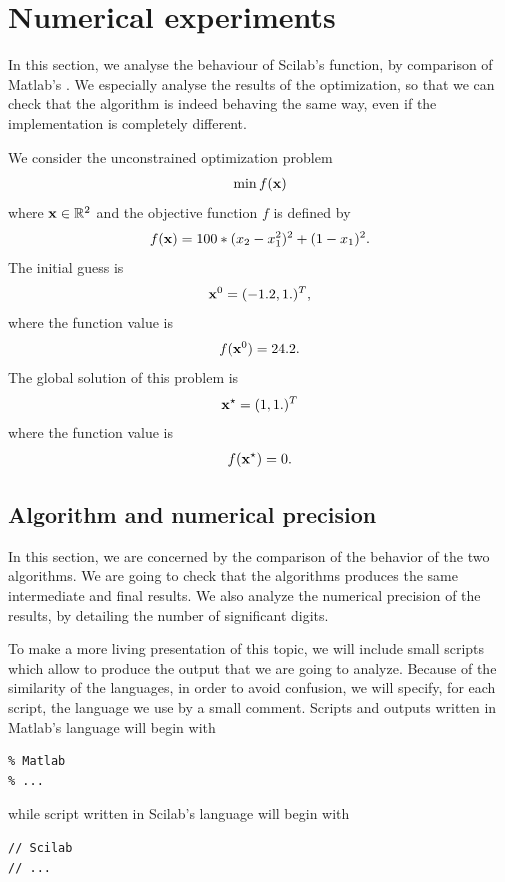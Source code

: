 \section{Numerical experiments}

In this section, we analyse the behaviour of Scilab's 
function, by comparison of Matlab's . We especially analyse 
the results of the optimization, so that we can check that the algorithm
is indeed behaving the same way, even if the implementation is completely 
different. 

We consider the unconstrained optimization problem \cite{citeulike:1903787}
\begin{eqnarray}
\min f(\mathbf{x})
\end{eqnarray}
where $\mathbf{x}\in\mathbb{R}^2$ and the objective function $f$ is defined by 
\begin{eqnarray}
f(\mathbf{x}) = 100*(x_2-x_1^2)^2+(1-x_1)^2.
\end{eqnarray}
The initial guess is 
\begin{eqnarray}
\mathbf{x}^0 = ( -1.2 , 1.)^T,
\end{eqnarray}
where the function value is 
\begin{eqnarray}
f(\mathbf{x}^0) = 24.2.
\end{eqnarray}
The global solution of this problem is
\begin{eqnarray}
\mathbf{x}^\star = ( 1 , 1.)^T
\end{eqnarray}
where the function value is 
\begin{eqnarray}
f(\mathbf{x}^\star) = 0.
\end{eqnarray}

\subsection{Algorithm and numerical precision}

In this section, we are concerned by the comparison of the behavior 
of the two algorithms. We are going to check that the algorithms 
produces the same intermediate and final results.
We also analyze the numerical precision of the results,
by detailing the number of significant digits.

To make a more living presentation of this topic, we will 
include small scripts which allow to produce the output 
that we are going to analyze. Because of the similarity of the languages, 
in order to avoid confusion, we will specify, for each script, the language 
we use by a small comment. Scripts and outputs written in Matlab's language will begin with 
\lstset{language=matlabscript}
\begin{lstlisting}
% Matlab
% ...
\end{lstlisting}
while script written in Scilab's language will begin with
\lstset{language=scilabscript}
\begin{lstlisting}
// Scilab
// ...
\end{lstlisting}

